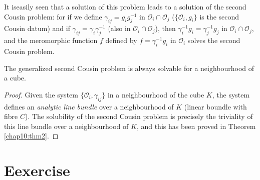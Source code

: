 It is\pageoriginale easily seen that a solution of this problem leads
to a solution of the second Cousin problem: for if we define
$\gamma_{ij} = g_i g^{-1}_j$ in $\mathscr{O}_i \cap \mathscr{O}_j$
($\{\mathscr{O}_i, g_i\}$ is the second Cousin datum) and if
$\gamma_{ij} = \gamma_i \gamma^{-1}_j$  (also in $\mathscr{O}_i \cap
\mathscr{O}_j$), then $\gamma^{-1}_i g_i = \gamma^{-1}_j g_j$  in
$\mathscr{O}_i \cap \mathscr{O}_j$, and the meromorphic function $f$
defined by $f = \gamma^{-1}_i g_i$ in $\mathscr{O}_i$ solves the
second Cousin problem.

\begin{thm}\label{chap10:thm3}
The generalized second Cousin problem is always solvable for a
neighbourhood of a cube.
\end{thm}

\begin{proof}
Given the system $\{\mathscr{O}_i, \gamma_{ij}\}$ in a neighbourhood
of the cube $K$, the system defines an \textit{analytic line bundle}
over a neighbourhood of $K$ (linear boundle with fibre $C$). The
solubility of the second Cousin problem is precisely the triviality of
this line bundle over a neighbourhood of $K$, and this has been proved
in Theorem \ref{chap10:thm2}.
\end{proof}


\chapter*{Eexercise}

